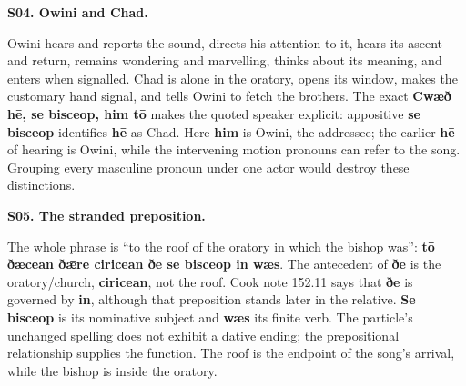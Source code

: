 \par\begin{minipage}{\linewidth}\raggedright
\textbf{S04. Owini and Chad.}

Owini hears and reports the sound, directs his attention to it, hears its ascent and return, remains wondering and marvelling, thinks about its meaning, and enters when signalled. Chad is alone in the oratory, opens its window, makes the customary hand signal, and tells Owini to fetch the brothers. The exact \textbf{Cwæð hē, se bisceop, him tō} makes the quoted speaker explicit: appositive \textbf{se bisceop} identifies \textbf{hē} as Chad. Here \textbf{him} is Owini, the addressee; the earlier \textbf{hē} of hearing is Owini, while the intervening motion pronouns can refer to the song. Grouping every masculine pronoun under one actor would destroy these distinctions.

\end{minipage}\par\addvspace{4pt}

\par\begin{minipage}{\linewidth}\raggedright
\textbf{S05. The stranded preposition.}

The whole phrase is “to the roof of the oratory in which the bishop was”: \textbf{tō ðæcean ðǣre ciricean ðe se bisceop in wæs}. The antecedent of \textbf{ðe} is the oratory/\allowbreak{}church, \textbf{ciricean}, not the roof. Cook note 152.11 says that \textbf{ðe} is governed by \textbf{in}, although that preposition stands later in the relative. \textbf{Se bisceop} is its nominative subject and \textbf{wæs} its finite verb. The particle’s unchanged spelling does not exhibit a dative ending; the prepositional relationship supplies the function. The roof is the endpoint of the song’s arrival, while the bishop is inside the oratory.

\end{minipage}\par\addvspace{4pt}

